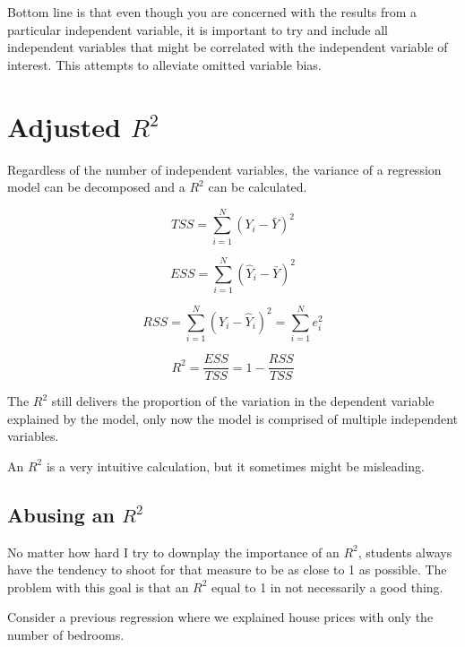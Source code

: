 \documentclass[
]{book}
\newenvironment{Shaded}{\begin{snugshade}}{\end{snugshade}}
\newcommand{\AttributeTok}[1]{\textcolor[rgb]{0.77,0.63,0.00}{#1}}
\newcommand{\FunctionTok}[1]{\textcolor[rgb]{0.00,0.00,0.00}{#1}}
\newcommand{\NormalTok}[1]{#1}
\newcommand{\OtherTok}[1]{\textcolor[rgb]{0.56,0.35,0.01}{#1}}
\newcommand{\SpecialCharTok}[1]{\textcolor[rgb]{0.00,0.00,0.00}{#1}}
\begin{document}
Bottom line is that even though you are concerned with the results from a particular independent variable, it is important to try and include all independent variables that might be correlated with the independent variable of interest. This attempts to alleviate omitted variable bias.

\hypertarget{adjusted-r2}{%
\section{\texorpdfstring{Adjusted \(R^2\)}{Adjusted R\^{}2}}\label{adjusted-r2}}

Regardless of the number of independent variables, the variance of a regression model can be decomposed and a \(R^2\) can be calculated.

\[TSS = \sum^{N}_{i=1}(Y_i - \bar{Y})^2\]

\[ESS = \sum^{N}_{i=1}(\hat{Y}_i - \bar{Y})^2\]

\[RSS = \sum^{N}_{i=1}(Y_i - \hat{Y}_i)^2 = \sum^{N}_{i=1}e_i^2\]

\[R^2 = \frac{ESS}{TSS} = 1 - \frac{RSS}{TSS}\]

The \(R^2\) still delivers the proportion of the variation in the dependent variable explained by the model, only now the model is comprised of multiple independent variables.

An \(R^2\) is a very intuitive calculation, but it sometimes might be misleading.

\hypertarget{abusing-an-r2}{%
\subsection{\texorpdfstring{Abusing an \(R^2\)}{Abusing an R\^{}2}}\label{abusing-an-r2}}

No matter how hard I try to downplay the importance of an \(R^2\), students always have the tendency to shoot for that measure to be as close to 1 as possible. The problem with this goal is that an \(R^2\) equal to 1 in not necessarily a good thing.

Consider a previous regression where we explained house prices with only the number of bedrooms.

\begin{Shaded}
\end{Shaded}
\end{document}

